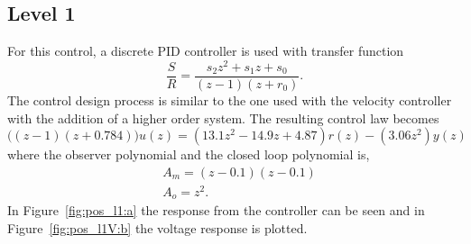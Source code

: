 \documentclass[12pt,a4paper]{article}
\begin{document}
  \subsection*{Level 1} 
  For this control, a discrete PID controller is used with transfer function
  \begin{equation}
      \label{eq:PIDdiscrete}
      \frac{S}{R} = \frac{s_2 z^2 + s_1 z + s_0}{(z-1)(z+r_0)}.
  \end{equation}
  The control design process is similar to the one used with the velocity
  controller with the addition of a higher order system. 
  The resulting control law becomes
  \begin{equation}
      \big((z-1)(z+0.784)\big)u(z)=(13.1z^2-14.9z+4.87)r(z)-(3.06z^2)y(z)
  \end{equation}
  where the observer polynomial and the closed loop polynomial is,
  \begin{align*}
        &A_m = (z-0.1)(z-0.1)\\
        &A_o = z^2.
  \end{align*}
  In Figure~\ref{fig:pos_l1:a} the response from
  the controller can be seen and in Figure~\ref{fig:pos_l1V:b} the
  voltage response is plotted. 
\end{document}
